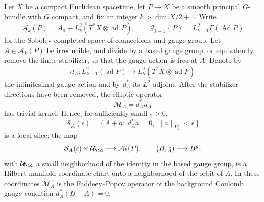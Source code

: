 \begin{proposition}
\label{prop:coulomb-slice-atlas}
Let \(X\) be a compact Euclidean spacetime, let \(P\to X\) be a smooth
principal \(G\)-bundle with \(G\) compact, and fix an integer
\(k>\dim X/2+1\).  Write
\[
  \mathcal A_k(P)
  =
  A_0+L^2_k(T^*X\otimes\operatorname{ad}P),
  \qquad
  \mathcal G_{k+1}(P)=L^2_{k+1}\Gamma(\operatorname{Ad}P)
\]
for the Sobolev-completed space of connections and gauge group.  Let
\(A\in\mathcal A_k(P)\) be irreducible, and divide by a based gauge group, or
equivalently remove the finite stabilizer, so that the gauge action is free at
\(A\).  Denote by
\[
  d_A:
  L^2_{k+1}(\operatorname{ad}P)
  \longrightarrow
  L^2_k(T^*X\otimes\operatorname{ad}P)
\]
the infinitesimal gauge action and by \(d_A^*\) its \(L^2\)-adjoint.  After
the stabilizer directions have been removed, the elliptic operator
\[
  \mathcal M_A=d_A^*d_A
\]
has trivial kernel.  Hence, for sufficiently small \(\epsilon>0\),
\[
  \mathcal S_A(\epsilon)
  =
  \{\,A+a:\ d_A^*a=0,\ \|a\|_{L^2_k}<\epsilon\,\}
\]
is a local slice: the map
\[
  \mathcal S_A(\epsilon)\times \mathcal U_{\id}
  \longrightarrow
  \mathcal A_k(P),
  \qquad
  (B,g)\longmapsto B^g ,
\]
with \(\mathcal U_{\id}\) a small neighborhood of the identity in the based
gauge group, is a Hilbert-manifold coordinate chart onto a neighborhood of the
orbit of \(A\).  In these coordinates \(\mathcal M_A\) is the
Faddeev--Popov operator of the background Coulomb gauge condition
\(d_A^*(B-A)=0\).
\end{proposition}

